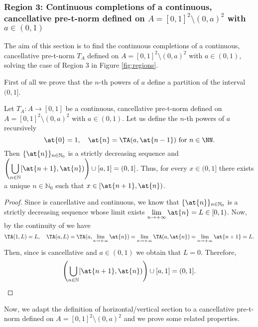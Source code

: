 \subsubsection{Region 3: Continuous completions of a continuous, cancellative pre-t-norm defined on $A=[0,1]^2 \setminus (0,a)^2$ with $a \in (0,1)$}\label{subsection:can:Region3}

The aim of this section is to find the continuous completions of a continuous, cancellative pre-t-norm $T_A$ defined on $A=[0,1]^2 \setminus (0,a)^2$ with $a \in (0,1)$, solving the case of Region 3 in Figure \ref{fig:regions}.

First of all we prove that the $n$-th powers of $a$ define a partition of the interval $(0,1]$.

\begin{lemma}\label{lem:can:sequencePartitionCompletion(0,a)} Let $T_A: A \to [0,1]$ be a continuous, cancellative pre-t-norm defined on $A=[0,1]^2 \setminus (0,a)^2$ with $a \in (0,1)$. Let us define the $n$-th powers of $a$ recursively
	$$\at{0}=1, \quad \at{n}=\TA(a,\at{n-1}) \text{ for } n \in \NN.$$	
	Then $\{\at{n}\}_{n \in \mathbb{N}_0}$ is a strictly decreasing sequence and $\displaystyle \left(\bigcup_{n \in \mathbb{N}} [\at{n+1},\at{n}) \right) \cup [a,1] = (0,1]$. Thus, for every $x \in (0,1]$ there exists a unique $n \in \mathbb{N}_0$ such that $x \in  [\at{n+1},\at{n})$.
\end{lemma}

\begin{proof}
	Since \TA is cancellative and continuous, we know that $\{\at{n}\}_{n \in \mathbb{N}_0}$ is a strictly decreasing sequence whose limit exists $\displaystyle \lim_{n \to + \infty} \at{n}=L \in [0,1)$. Now, by the continuity of \TA we have
	$$\TA(1,L)=L, \quad \TA(a,L)=\TA(a,\lim_{n \to + \infty} \at{n})= \lim_{n \to + \infty} \TA(a,\at{n}) = \lim_{n \to + \infty} \at{n+1}=L.$$
	Then, since \TA is cancellative and $a \in (0,1)$ we obtain that $L=0$. Therefore, 
	$$\left(\bigcup_{n \in \mathbb{N}} [\at{n+1},\at{n}) \right) \cup [a,1] = (0,1].$$
\end{proof}

Now, we adapt the definition of horizontal/vertical section to a cancellative pre-t-norm defined on $A=[0,1]^2 \setminus (0,a)^2$ and we prove some related properties.

